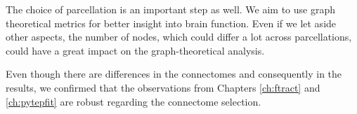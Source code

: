 The choice of parcellation is an important step as well. We aim to use graph theoretical metrics for better insight into brain function. Even if we let aside other aspects, the number of nodes, which could differ a lot across parcellations, could have a great impact on the graph-theoretical analysis.

Even though there are differences in the connectomes and consequently in the results, we confirmed that the observations from Chapters \ref{ch:ftract} and \ref{ch:pytepfit} are robust regarding the connectome selection.